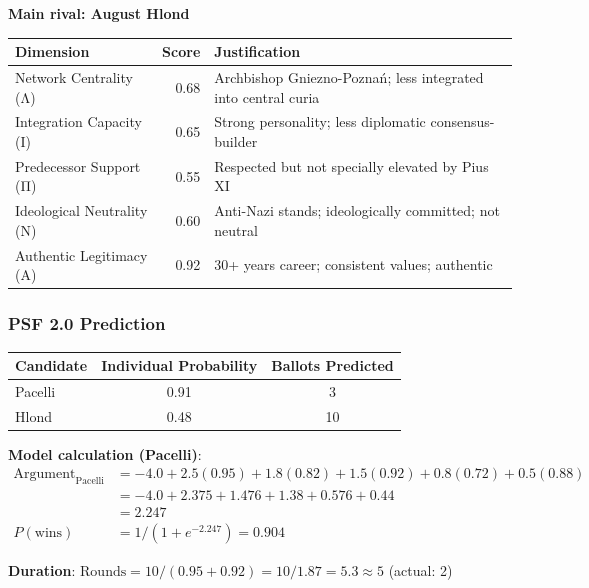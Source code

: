 \documentclass[11pt,a4paper]{article}
\begin{document}
\textbf{Main rival: August Hlond}

\begin{center}
\begin{tabular}{lrp{4cm}}
\toprule
\textbf{Dimension} & \textbf{Score} & \textbf{Justification} \\
\midrule
Network Centrality (Λ) & 0.68 & Archbishop Gniezno-Poznań; less integrated into central curia \\
Integration Capacity (Ι) & 0.65 & Strong personality; less diplomatic consensus-builder \\
Predecessor Support (Π) & 0.55 & Respected but not specially elevated by Pius XI \\
Ideological Neutrality (Ν) & 0.60 & Anti-Nazi stands; ideologically committed; not neutral \\
Authentic Legitimacy (Α) & 0.92 & 30+ years career; consistent values; authentic \\
\bottomrule
\end{tabular}
\end{center}

\subsubsection{PSF 2.0 Prediction}

\begin{center}
\begin{tabular}{lcc}
\toprule
\textbf{Candidate} & \textbf{Individual Probability} & \textbf{Ballots Predicted} \\
\midrule
Pacelli & 0.91 & 3 \\
Hlond & 0.48 & 10 \\
\bottomrule
\end{tabular}
\end{center}

\textbf{Model calculation (Pacelli)}:
\begin{equation}
\begin{split}
\text{Argument}_{\text{Pacelli}} &= -4.0 + 2.5(0.95) + 1.8(0.82) + 1.5(0.92) + 0.8(0.72) + 0.5(0.88) \\
&= -4.0 + 2.375 + 1.476 + 1.38 + 0.576 + 0.44 \\
&= 2.247 \\
P(\text{wins}) &= 1 / (1 + e^{-2.247}) = 0.904
\end{split}
\end{equation}

\textbf{Duration}: $\text{Rounds} = 10 / (0.95 + 0.92) = 10 / 1.87 = 5.3 \approx 5$ (actual: 2)
\end{document}
